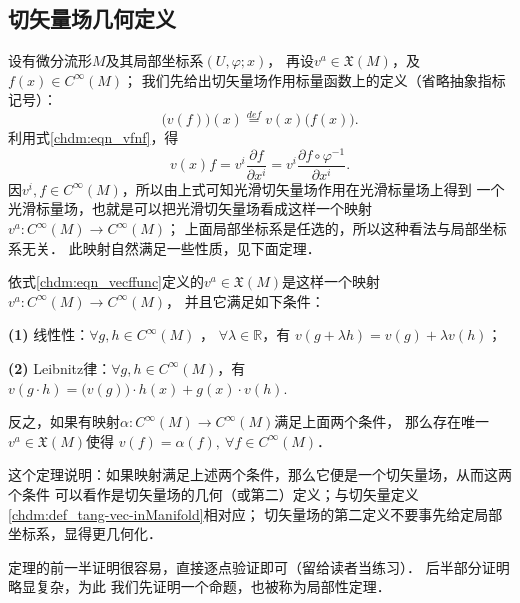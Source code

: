 \subsection{切矢量场几何定义}\label{chdm:sec_vdef2}
设有微分流形$M$及其局部坐标系$(U,\varphi;x)$，
再设$v^a\in \mathfrak{X}(M)$，及$f(x) \in C^\infty(M)$；
我们先给出切矢量场作用标量函数上的定义（省略抽象指标记号）：
\begin{equation}\label{chdm:eqn_vecffunc}
    \bigl(v(f)\bigr) (x)  \overset{def}{=}  v(x) \bigl( f(x)\bigr) .
\end{equation}
利用式\eqref{chdm:eqn_vfnf}，得
\begin{equation}
    v(x) f = v^i \frac{\partial f }{\partial x^i} = 
    v^i \frac{\partial f\circ \varphi^{-1} }{\partial x^i}.
\end{equation}
因$v^i, f \in C^\infty(M)$，所以由上式可知光滑切矢量场作用在光滑标量场上得到
一个光滑标量场，也就是可以把光滑切矢量场看成这样一个映射$v^a:C^\infty(M)\to C^\infty(M)$；
上面局部坐标系是任选的，所以这种看法与局部坐标系无关．
此映射自然满足一些性质，见下面定理．



\begin{theorem}\label{chdm:thm_vf-def2}
    依式\eqref{chdm:eqn_vecffunc}定义的$v^a\in \mathfrak{X}(M)$是这样一个映射$v^a:C^\infty(M)\to C^\infty(M)$，
    并且它满足如下条件：

    {\bfseries (1)} 线性性：$\forall g,h \in C^\infty(M) $ ， $\forall \lambda \in \mathbb{R}$，有
    $v (g+\lambda h) = v (g)+ \lambda v (h) $；

    {\bfseries (2)} Leibnitz律：$\forall g,h \in C^\infty(M) $，有
    $v (g\cdot h) = \bigl(v(g)\bigr)\cdot h(x)+ g(x)\cdot v (h) .$
    
    反之，如果有映射$\alpha:C^\infty(M)\to C^\infty(M) $满足上面两个条件，
    那么存在唯一$v^a\in \mathfrak{X}(M)$使得
    $v(f)=\alpha(f),\ \forall f\in C^\infty(M)$．
\end{theorem}
这个定理说明：如果映射满足上述两个条件，那么它便是一个切矢量场，从而这两个条件
可以看作是切矢量场的几何（或第二）定义；与切矢量定义\ref{chdm:def_tang-vec-inManifold}相对应；
切矢量场的第二定义不要事先给定局部坐标系，显得更几何化．

定理的前一半证明很容易，直接逐点验证即可（留给读者当练习）．
后半部分证明略显复杂，为此
我们先证明一个命题，也被称为{\heiti 局部性定理}．


